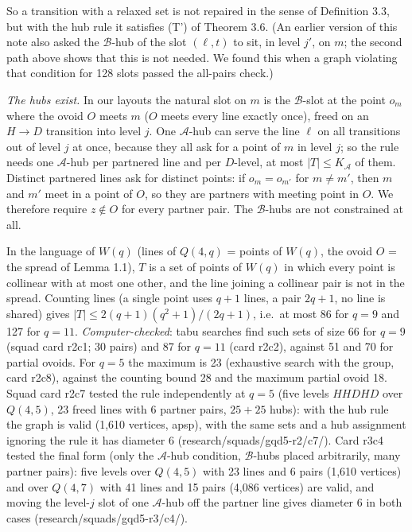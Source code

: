 \documentclass[
  11pt,
]{article}
\begin{document}
So a transition with a relaxed set is not repaired in the sense of
Definition 3.3, but with the hub rule it satisfies (T') of Theorem 3.6.
(An earlier version of this note also asked the \(\mathcal B\)-hub of
the slot \((\ell,t)\) to sit, in level \(j'\), on \(m\); the second path
above shows that this is not needed. We found this when a graph
violating that condition for 128 slots passed the all-pairs check.)

\emph{The hubs exist.} In our layouts the natural slot on \(m\) is the
\(\mathcal B\)-slot at the point \(o_m\) where the ovoid \(O\) meets
\(m\) (\(O\) meets every line exactly once), freed on an \(H\to D\)
transition into level \(j\). One \(\mathcal A\)-hub can serve the line
\(\ell\) on all transitions out of level \(j\) at once, because they all
ask for a point of \(m\) in level \(j\); so the rule needs one
\(\mathcal A\)-hub per partnered line and per \(D\)-level, at most
\(|T|\le K_{\mathcal A}\) of them. Distinct partnered lines ask for
distinct points: if \(o_m = o_{m'}\) for \(m\ne m'\), then \(m\) and
\(m'\) meet in a point of \(O\), so they are partners with meeting point
in \(O\). We therefore require \(z\notin O\) for every partner pair. The
\(\mathcal B\)-hubs are not constrained at all.

In the language of \(W(q)\) (lines of \(Q(4,q)\) = points of \(W(q)\),
the ovoid \(O\) = the spread of Lemma 1.1), \(T\) is a set of points of
\(W(q)\) in which every point is collinear with at most one other, and
the line joining a collinear pair is not in the spread. Counting lines
(a single point uses \(q+1\) lines, a pair \(2q+1\), no line is shared)
gives \(|T|\le 2(q+1)(q^2+1)/(2q+1)\), i.e.~at most 86 for \(q = 9\) and
127 for \(q = 11\). \emph{Computer-checked}: tabu searches find such
sets of size 66 for \(q = 9\) (squad card r2c1; 30 pairs) and 87 for
\(q = 11\) (card r2c2), against 51 and 70 for partial ovoids. For
\(q = 5\) the maximum is 23 (exhaustive search with the group, card
r2c8), against the counting bound 28 and the maximum partial ovoid 18.
Squad card r2c7 tested the rule independently at \(q = 5\) (five levels
\(HHDHD\) over \(Q(4,5)\), 23 freed lines with 6 partner pairs,
\(25+25\) hubs): with the hub rule the graph is valid (1,610 vertices,
apsp), with the same sets and a hub assignment ignoring the rule it has
diameter 6 (research/squads/gqd5-r2/c7/). Card r3c4 tested the final
form (only the \(\mathcal A\)-hub condition, \(\mathcal B\)-hubs placed
arbitrarily, many partner pairs): five levels over \(Q(4,5)\) with 23
lines and 6 pairs (1,610 vertices) and over \(Q(4,7)\) with 41 lines and
15 pairs (4,086 vertices) are valid, and moving the level-\(j\) slot of
one \(\mathcal A\)-hub off the partner line gives diameter 6 in both
cases (research/squads/gqd5-r3/c4/).
\end{document}
